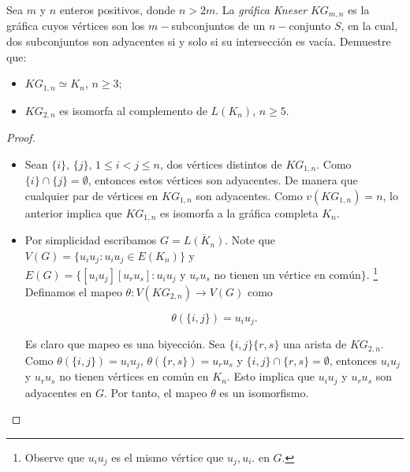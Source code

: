 \documentclass[12pt]{article}
\newenvironment{problem}[2][Problema]{\begin{trivlist}
\item[\hskip \labelsep {\bfseries #1}\hskip \labelsep {\bfseries #2.}]}{\end{trivlist}}
\begin{document}
\begin{problem}{1.3.8}
Sea $m$ y $n$ enteros positivos, donde $n > 2m$. La \textit{gráfica Kneser} $KG_{m,n}$ es la gráfica cuyos vértices son los $m-$subconjuntos de un $n-$conjunto $S$, en la cual, dos subconjuntos son adyacentes si y solo si su intersección es vacía. Demuestre que:
\begin{itemize}
    \item[a)] $KG_{1,n} \simeq K_n$, $n \geq 3$;
    \item[b)] $KG_{2,n}$ es isomorfa al complemento de $L(K_n)$, $n \geq 5.$
\end{itemize}
\end{problem}
\begin{proof}\text{ }
\begin{itemize}
    \item[a)] Sean $\{i\}$, $\{j\}$, $1\leq i < j \leq n$, dos vértices distintos de $KG_{1,n}$. Como $\{i\} \cap \{j\} = \emptyset$, entonces estos vértices son adyacentes. De manera que cualquier par de vértices en $KG_{1,n}$ son adyacentes. Como $v(KG_{1,n}) = n$, lo anterior implica que $KG_{1,n}$ es isomorfa a la gráfica completa $K_n$.
    
    \item[b)] Por simplicidad escribamos  $G = \overline{L(K_n)}$. Note que $V(G) = \{u_i u_j: u_i u_j \in E(K_n) \}$ y $E(G) = \{[u_i u_j][u_r u_s]: u_i u_j \text{ y } u_r u_s \text{ no tienen un vértice en común} \}.$ \footnote{Observe que $u_i u_j$ es el mismo vértice que $u_j, u_i.$ en $G.$} Definamos el mapeo $\theta: V(KG_{2,n}) \rightarrow V(G)$ como 

    $$\theta(\{i,j\}) = u_iu_j.$$
    
    Es claro que mapeo es una biyección. Sea $\{i,j\}\{r,s\}$ una arista de $KG_{2,n}$. Como $\theta(\{i,j\}) = u_i u_j$,  $\theta(\{r,s\}) = u_r u_s$ y $\{i,j\} \cap \{r,s\} = \emptyset$, entonces $u_i u_j$ y $u_r u_s$ no tienen vértices en común en $K_n.$ Esto implica que $u_i u_j$ y $u_r u_s$ son adyacentes en $G.$ Por tanto, el mapeo $\theta$ es un isomorfismo.


    
\end{itemize}

\end{proof}
\end{document}
